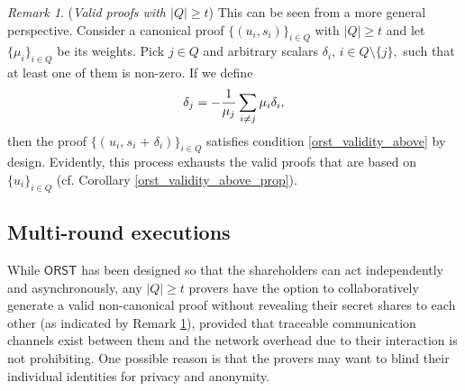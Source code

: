 \documentclass[10pt, psamsfonts, reqno]{amsart}
\theoremstyle{definition}
\theoremstyle{remark}
\newtheorem{rem}[thm]{Remark}
\numberwithin{equation}{section}
\begin{document}
\begin{rem}\label{orst_valid_above_rem}
(\textit{Valid proofs with $|Q| \ge t$})
This can be seen from a more general perspective.
Consider a canonical proof $\{(u_i, s_i)\}_{i \in Q}$
with $|Q| \ge t$ and let $\{\mu_i\}_{i \in Q}$ be its weights.
Pick $j \in Q$ and arbitrary scalars
$\delta_i,\hspace{2pt} i \in Q \setminus \{j\},$
such that at least one of them is non-zero.
If we define
\vspace{5pt}
\begin{equation*}
\delta_j = - \frac{1}{\mu_j}
\sum_{i \neq j} \mu_i \delta_i,
\vspace{5pt}
\end{equation*}
then the proof $
	\{
		(
			\hspace{1pt}
			u_i,
			\hspace{1pt}
			s_i
			\hspace{1pt}
			+
			\hspace{1pt}
			\delta_i
		)
	\}_{i \in Q}$
satisfies condition \eqref{orst_validity_above}
by design. Evidently, this process exhausts the valid proofs
that are based on $\{u_i\}_{i \in Q}$
(cf. Corollary \ref{orst_validity_above_prop}).
\end{rem}

\subsection{Multi-round executions}\label{section_multi_round}

While $\mathsf{ORST}$ has been designed so that
the shareholders can act independently and asynchronously,
any $|Q| \ge t$ provers have the option to collaboratively
generate a valid non-canonical proof without
revealing their secret shares to each other
(as indicated by Remark \ref{orst_valid_above_rem}),
provided that traceable communication channels
exist between them and the network overhead
due to their interaction is not prohibiting.
One possible reason is that the provers
may want to blind their individual identities
for privacy and anonymity.
\end{document}

